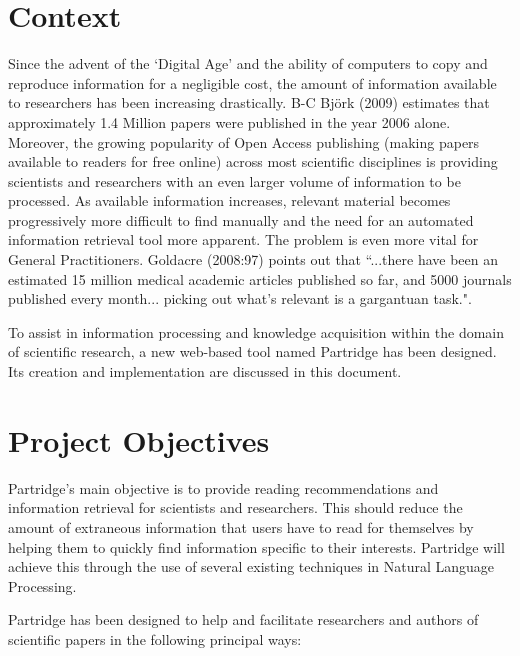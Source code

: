 %
%
\section{Context}

Since the advent of the `Digital Age' and the ability of computers to copy and
reproduce information for a negligible cost, the amount of information
available to researchers has been increasing drastically.  B-C Bj\"{o}rk (2009)
estimates that approximately 1.4 Million papers were published in the year 2006
alone\cite{bjork2009}. Moreover, the growing popularity of Open Access
publishing (making papers available to readers for free online\cite{Suber2012})
across most scientific disciplines\cite{bjork2009}\cite{harnad2004comparing} is
providing scientists and researchers with an even larger volume of information
to be processed. As available information increases, relevant material becomes
progressively more difficult to find manually and the need for an automated
information retrieval tool more apparent. The problem is even more vital for
General Practitioners. Goldacre (2008:97) points out that ``...there have been an
estimated 15 million medical academic articles published so far, and 5000
journals published every month... picking out what's relevant is a gargantuan
task."\cite{goldacre2008bad}.

To assist in information processing and knowledge acquisition within the domain
of scientific research, a new web-based tool named Partridge has been designed. Its
creation and implementation are discussed in this document.

\section{Project Objectives}
\label{sec:objectives}
Partridge's main objective is to provide reading recommendations and
information retrieval for scientists and researchers. This should reduce the
amount of extraneous information that users have to read for themselves by
helping them to quickly find information specific to their interests.
Partridge will achieve this through the use of several existing techniques in
Natural Language Processing.

Partridge has been designed to help and facilitate researchers and authors of
scientific papers in the following principal ways:

